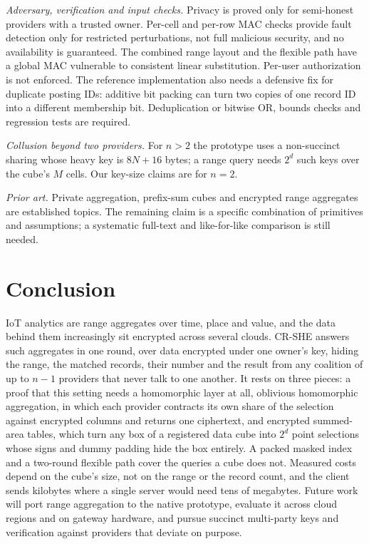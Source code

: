 \documentclass[a4paper,fleqn]{cas-sc}
\begin{document}
\emph{Adversary, verification and input checks.} Privacy is proved only
for semi-honest providers with a trusted owner. Per-cell and per-row
MAC checks provide fault detection only for restricted perturbations,
not full malicious security, and no availability is guaranteed.
The combined range layout and the flexible path have a global MAC
vulnerable to consistent linear substitution. Per-user authorization is
not enforced. The reference implementation also needs a defensive
fix for duplicate posting IDs: additive bit packing can turn
two copies of one record ID into a different membership bit.
Deduplication or bitwise OR, bounds checks and regression tests are required.

\emph{Collusion beyond two providers.} For $n>2$ the prototype uses a
non-succinct sharing whose heavy key is $8N+16$ bytes; a range query needs
$2^d$ such keys over the cube's $M$ cells. Our key-size claims are for $n=2$.

\emph{Prior art.} Private aggregation, prefix-sum cubes and
encrypted range aggregates are established topics. The remaining
claim is a specific combination of primitives and assumptions;
a systematic full-text and like-for-like comparison is still needed.

\section{Conclusion}
\label{sec:conclusion}

IoT analytics are range aggregates over time, place and value, and the data
behind them increasingly sit encrypted across several clouds. CR-SHE answers
such aggregates in one round, over data encrypted under one owner's key,
hiding the range, the matched records, their number and the result from any
coalition of up to $n-1$ providers that never talk to one another. It rests on
three pieces: a proof that this setting needs a homomorphic layer at all,
oblivious homomorphic aggregation, in which each provider contracts its own
share of the selection against encrypted columns and returns one ciphertext,
and encrypted summed-area tables, which turn any box of a registered data cube
into $2^d$ point selections whose signs and dummy padding hide the box
entirely. A packed masked index and a two-round flexible path cover the
queries a cube does not. Measured costs depend on the cube's size, not on the
range or the record count, and the client sends kilobytes where a single
server would need tens of megabytes. Future work will port range aggregation to
the native prototype, evaluate it across cloud regions and on gateway
hardware, and pursue succinct multi-party keys and verification against
providers that deviate on purpose.
\end{document}
